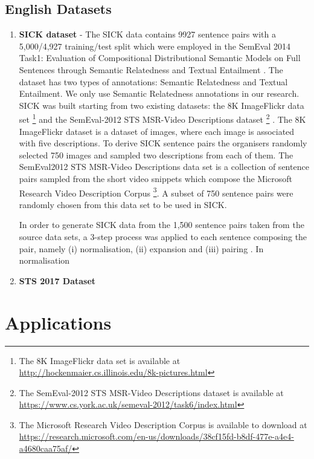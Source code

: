 \subsection{English Datasets}
\begin{enumerate}
  \item \textbf{SICK dataset} - The SICK data contains 9927 sentence pairs with a 5,000/4,927 training/test split which were employed in the SemEval 2014 Task1: Evaluation of Compositional Distributional Semantic Models on Full Sentences through Semantic Relatedness and Textual Entailment \cite{marelli-etal-2014-semeval}. The dataset has two types of annotations: Semantic Relatedness and Textual Entailment. We only use Semantic Relatedness annotations in our research. SICK was built starting from two existing datasets: the 8K ImageFlickr data set \footnote{The 8K ImageFlickr data set is available at \url{http://hockenmaier.cs.illinois.edu/8k-pictures.html}} \cite{rashtchian-etal-2010-collecting} and the SemEval-2012 STS MSR-Video Descriptions dataset \footnote{The SemEval-2012 STS MSR-Video Descriptions dataset is available at \url{https://www.cs.york.ac.uk/semeval-2012/task6/index.html}} \cite{agirre-etal-2012-semeval}. The 8K ImageFlickr dataset is a dataset of images, where each image is associated with five descriptions. To derive SICK sentence pairs the organisers randomly selected 750 images and sampled two descriptions from each of them. The SemEval2012 STS MSR-Video Descriptions data set is a collection of sentence pairs sampled from the short video snippets which compose the Microsoft Research Video Description Corpus \footnote{The Microsoft Research Video Description Corpus is available to download at \url{https://research.microsoft.com/en-us/downloads/38cf15fd-b8df-477e-a4e4-a4680caa75af/}}. A subset of 750 sentence pairs were randomly chosen from this data set to be used in SICK. 
  
  In order to generate SICK data from the 1,500 sentence pairs taken from the source data sets, a 3-step process was applied to each sentence composing the pair, namely (i) normalisation, (ii) expansion and (iii) pairing \cite{marelli-etal-2014-semeval}. In normalisation 
  
  \item \textbf{STS 2017 Dataset}
  
\end{enumerate}

\section{Applications}


